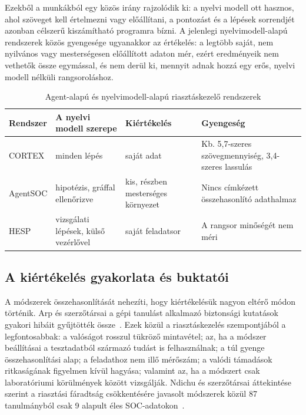 Ezekből a munkákból egy közös irány rajzolódik ki: a nyelvi modell ott hasznos, ahol szöveget kell értelmezni vagy előállítani, a pontozást és a lépések sorrendjét azonban célszerű kiszámítható programra bízni. A jelenlegi nyelvimodell-alapú rendszerek közös gyengesége ugyanakkor az értékelés: a legtöbb saját, nem nyilvános vagy mesterségesen előállított adaton mér, ezért eredményeik nem vethetők össze egymással, és nem derül ki, mennyit adnak hozzá egy erős, nyelvi modell nélküli rangsoroláshoz.

\begin{table}[H]
    \centering
    \caption{Agent-alapú és nyelvimodell-alapú riasztáskezelő rendszerek}
    \label{tab:agentek}
    \small
    \begin{tabular}{|L{2.3cm}|L{3.2cm}|L{3.0cm}|L{4.7cm}|}
        \hline
        \textbf{Rendszer} & \textbf{A nyelvi modell szerepe} & \textbf{Kiértékelés} & \textbf{Gyengeség} \\ \hline
        CORTEX \cite{wei2025cortex} & minden lépés & saját adat & Kb. 5,7-szeres szövegmennyiség, 3,4-szeres lassulás \\ \hline
        AgentSOC \cite{roy2026agentsoc} & hipotézis, gráffal ellenőrizve & kis, részben mesterséges környezet & Nincs címkézett összehasonlító adathalmaz \\ \hline
        HESP \cite{liu2026hesp} & vizsgálati lépések, külső vezérlővel & saját feladatsor & A rangsor minőségét nem méri \\ \hline
    \end{tabular}
\end{table}

\subsection{A kiértékelés gyakorlata és buktatói}\label{sec:ertekeles-irodalom}
A módszerek összehasonlítását nehezíti, hogy kiértékelésük nagyon eltérő módon történik. Arp és szerzőtársai a gépi tanulást alkalmazó biztonsági kutatások gyakori hibáit gyűjtötték össze~\cite{arp2022}. Ezek közül a riasztáskezelés szempontjából a legfontosabbak: a valóságot rosszul tükröző mintavétel; az, ha a módszer beállításai a tesztadatból származó tudást is felhasználnak; a túl gyenge összehasonlítási alap; a feladathoz nem illő mérőszám; a valódi támadások ritkaságának figyelmen kívül hagyása; valamint az, ha a módszert csak laboratóriumi körülmények között vizsgálják. Ndichu és szerzőtársai áttekintése szerint a riasztási fáradtság csökkentésére javasolt módszerek közül 87 tanulmányból csak 9 alapult éles SOC-adatokon~\cite{ndichu2026}.

